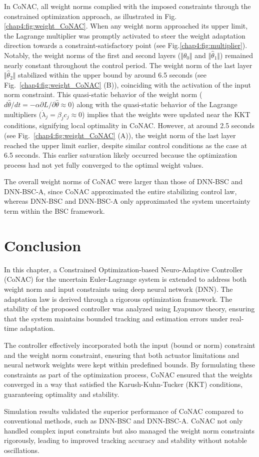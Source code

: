In CoNAC, all weight norms complied with the imposed constraints through the constrained optimization approach, as illustrated in Fig.\ref{chap4:fig:weight_CoNAC}. When any weight norm approached its upper limit, the Lagrange multiplier was promptly activated to steer the weight adaptation direction towards a constraint-satisfactory point (see Fig.\ref{chap4:fig:multiplier}). Notably, the weight norms of the first and second layers ($\Vert {{{\hat \theta }_0}} \Vert$ and $\Vert {{{\hat \theta }_1}} \Vert$) remained nearly constant throughout the control period. The weight norm of the last layer $\Vert {{{\hat \theta }_2}} \Vert$ stabilized within the upper bound by around 6.5 seconds (see Fig.~\ref{chap4:fig:weight_CoNAC} (B)), coinciding with the activation of the input norm constraint. This quasi-static behavior of the weight norm (\ie $d{\hat\theta}/dt=-\alpha\partial L/\partial \hat\theta \approx 0$) along with the quasi-static behavior of the Lagrange multipliers (\ie $\dot\lambda_j = \beta_j c_j \approx 0$) implies that the weights were updated near the KKT conditions, signifying local optimality in CoNAC. However, at around 2.5 seconds (see Fig.~\ref{chap4:fig:weight_CoNAC} (A)), the weight norm of the last layer reached the upper limit earlier, despite similar control conditions as the case at 6.5 seconds. This earlier saturation likely occurred because the optimization process had not yet fully converged to the optimal weight values.

The overall weight norms of CoNAC were larger than those of DNN-BSC and DNN-BSC-A, since CoNAC approximated the entire stabilizing control law, whereas DNN-BSC and DNN-BSC-A only approximated the system uncertainty term within the BSC framework.

\section{Conclusion} 

In this chapter, a Constrained Optimization-based Neuro-Adaptive Controller \allowbreak (CoNAC) for the uncertain Euler-Lagrange system is extended to address both weight norm and input constraints using deep neural network (DNN).
The adaptation law is derived through a rigorous optimization framework. 
The stability of the proposed controller was analyzed using Lyapunov theory, ensuring that the system maintains bounded tracking and estimation errors under real-time adaptation.

The controller effectively incorporated both the input (bound or norm) constraint and the weight norm constraint, ensuring that both actuator limitations and neural network weights were kept within predefined bounds. 
By formulating these constraints as part of the optimization process, CoNAC ensured that the weights converged in a way that satisfied the Karush-Kuhn-Tucker (KKT) conditions, guaranteeing optimality and stability.

Simulation results validated the superior performance of CoNAC compared to conventional methods, such as DNN-BSC and DNN-BSC-A. 
CoNAC not only handled complex input constraints but also managed the weight norm constraints rigorously, leading to improved tracking accuracy and stability without notable oscillations.
